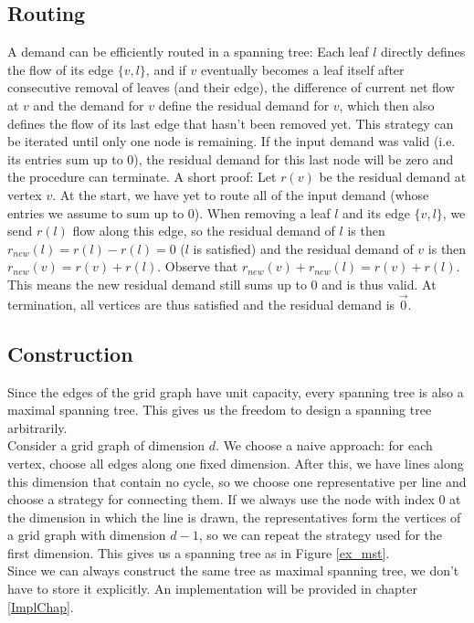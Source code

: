 \subsection{Routing}
A demand can be efficiently routed in a spanning tree: Each leaf $l$ directly defines the flow of its edge $\{v,l\}$, and if $v$ eventually becomes a leaf itself after consecutive removal of leaves (and their edge), the difference of current net flow at $v$ and the demand for $v$ define the residual demand for $v$, which then also defines the flow of its last edge that hasn't been removed yet. This strategy can be iterated until only one node is remaining. If the input demand was valid (i.e. its entries sum up to $0$), the residual demand for this last node will be zero and the procedure can terminate. A short proof: Let $r(v)$ be the residual demand at vertex $v$. At the start, we have yet to route all of the input demand (whose entries we assume to sum up to $0$). When removing a leaf $l$ and its edge $\{v,l\}$, we send $r(l)$ flow along this edge, so the residual demand of $l$ is then $r_{new}(l)=r(l)-r(l)=0$ ($l$ is satisfied) and the residual demand of $v$ is then $r_{new}(v)=r(v)+r(l)$. Observe that $r_{new}(v)+r_{new}(l)=r(v)+r(l)$. This means the new residual demand still sums up to $0$ and is thus valid. At termination, all vertices are thus satisfied and the residual demand is $\vec{0}$.\\

\subsection{Construction}
\label{sec_constrmst}
Since the edges of the grid graph have unit capacity, every spanning tree is also a maximal spanning tree. This gives us the freedom to design a spanning tree arbitrarily.\\
Consider a grid graph of dimension $d$. We choose a naive approach: for each vertex, choose all edges along one fixed dimension. After this, we have lines along this dimension that contain no cycle, so we choose one representative per line and choose a strategy for connecting them. If we always use the node with index $0$ at the dimension in which the line is drawn, the representatives form the vertices of a grid graph with dimension $d-1$, so we can repeat the strategy used for the first dimension. This gives us a spanning tree as in Figure \ref{ex_mst}.\\

Since we can always construct the same tree as maximal spanning tree, we don't have to store it explicitly. An implementation will be provided in chapter \ref{ImplChap}.

